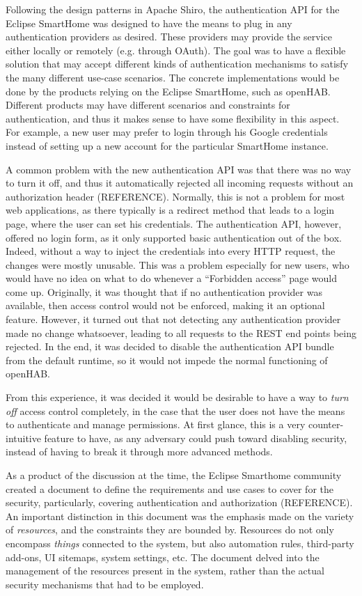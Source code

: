 \documentclass[12pt]{article}
\begin{document}
Following the design patterns in Apache Shiro, the authentication API for the Eclipse SmartHome was designed to have the means to plug in any authentication providers as desired. These providers may provide the service either locally or remotely (e.g. through OAuth). The goal was to have a flexible solution that may accept different kinds of authentication mechanisms to satisfy the many different use-case scenarios. The concrete implementations would be done by the products relying on the Eclipse SmartHome, such as openHAB. Different products may have different scenarios and constraints for authentication, and thus it makes sense to have some flexibility in this aspect. For example, a new user may prefer to login through his Google credentials instead of setting up a new account for the particular SmartHome instance. 

A common problem with the new authentication API was that there was no way to turn it off, and thus it automatically rejected all incoming requests without an authorization header (REFERENCE). Normally, this is not a problem for most web applications, as there typically is a redirect method that leads to a login page, where the user can set his credentials. The authentication API, however, offered no login form, as it only supported basic authentication out of the box. Indeed, without a way to inject the credentials into every HTTP request, the changes were mostly unusable. This was a problem especially for new users, who would have no idea on what to do whenever a ``Forbidden access'' page would come up. Originally, it was thought that if no authentication provider was available, then access control would not be enforced, making it an optional feature. However, it turned out that not detecting any authentication provider made no change whatsoever, leading to all requests to the REST end points being rejected. In the end, it was decided to disable the authentication API bundle from the default runtime, so it would not impede the normal functioning of openHAB.

From this experience, it was decided it would be desirable to have a way to \emph{turn off} access control completely, in the case that the user does not have the means to authenticate and manage permissions. At first glance, this is a very counter-intuitive feature to have, as any adversary could push toward disabling security, instead of having to break it through more advanced methods. 

As a product of the discussion at the time, the Eclipse Smarthome community created a document to define the requirements and use cases to cover for the security, particularly, covering authentication and authorization (REFERENCE). An important distinction in this document was the emphasis made on the variety of \emph{resources}, and the constraints they are bounded by. Resources do not only encompass \emph{things} connected to the system, but also automation rules, third-party add-ons, UI sitemaps, system settings, etc. The document delved into the management of the resources present in the system, rather than the actual security mechanisms that had to be employed. 
\end{document}
